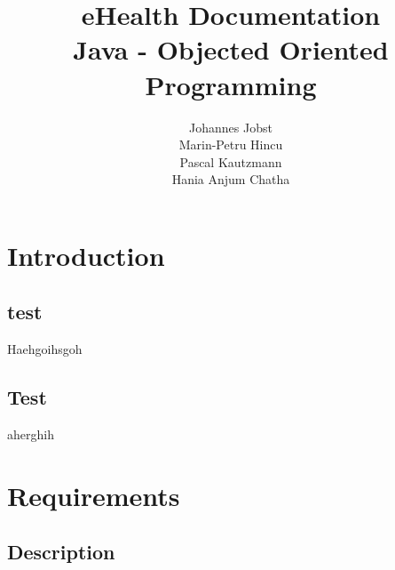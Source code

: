\documentclass[]{report}
\title{\textbf{eHealth Documentation}\\Java - Objected Oriented Programming}
\author{Johannes Jobst\\Marin-Petru Hincu\\Pascal Kautzmann\\Hania Anjum Chatha}
\begin{document}
\maketitle


\tableofcontents

\chapter{Introduction}
\section{test}
Haehgoihsgoh
\section{Test}
aherghih
\chapter{Requirements}
\section{Description}
\end{document}
